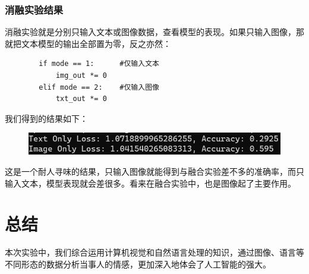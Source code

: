 \documentclass{article}
\begin{document}
\subsubsection{消融实验结果}
消融实验就是分别只输入文本或图像数据，查看模型的表现。如果只输入图像，那就把文本模型的输出全部置为零，反之亦然：
\begin{lstlisting}
        if mode == 1:      #仅输入文本
            img_out *= 0
        elif mode == 2:    #仅输入图像
            txt_out *= 0
\end{lstlisting}
我们得到的结果如下：
\begin{figure}[h]
    \centering
    \includegraphics[width=0.5\linewidth]{消融实验结果.png}
    \label{fig:enter-label}
\end{figure}
这是一个耐人寻味的结果，只输入图像就能得到与融合实验差不多的准确率，而只输入文本，模型表现就会差很多。看来在融合实验中，也是图像起了主要作用。
\section{总结}
本次实验中，我们综合运用计算机视觉和自然语言处理的知识，通过图像、语言等不同形态的数据分析当事人的情感，更加深入地体会了人工智能的强大。
\end{document}
